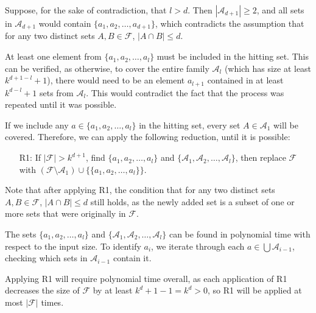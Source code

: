\documentclass[12pt]{article}
\begin{document}
	Suppose, for the sake of contradiction, that \(l > d\). Then
	\(|\mathcal{A}_{d + 1}| \geqslant 2\), and all sets in
	\(\mathcal{A}_{d + 1}\) would contain \(\{a_{1}, a_{2}, \ldots,
	a_{d + 1}\}\), which contradicts the assumption that for any two distinct
	sets \(A, B \in \mathcal{F}\), \(|A \cap B| \leqslant d\).
	
	\medskip
	
	At least one element from \(\{a_{1}, a_{2}, \ldots, a_{l}\}\) must be
	included in the hitting set. This can be verified, as otherwise, to cover
	the entire family \(\mathcal{A}_{l}\) (which has size at least
	\(k^{d + 1 - l} + 1\)), there would need to be an element \(a_{l + 1}\)
	contained in at least \(k^{d - l} + 1\) sets from \(\mathcal{A}_{l}\). This
	would contradict the fact that the process was repeated until it was
	possible.
	
	\medskip
	
	If we include any \(a \in \{a_{1}, a_{2}, \ldots, a_{l}\}\) in the hitting
	set, every set \(A \in \mathcal{A}_{1}\) will be covered. Therefore, we can
	apply the following reduction, until it is possible:
	\begin{itemize}
		\item[R1:] If \(|\mathcal{F}| > k^{d + 1}\), find \(\{a_{1}, a_{2},
		           \ldots, a_{l}\}\) and \(\{\mathcal{A}_{1}, \mathcal{A}_{2},
		           \ldots, \mathcal{A}_{l}\}\), then replace \(\mathcal{F}\)
		           with \((\mathcal{F} \setminus \mathcal{A}_{1}) \cup
		           \{\{a_{1}, a_{2}, \ldots, a_{l}\}\}\).
	\end{itemize}
	Note that after applying R1, the condition that for any two distinct sets
	\(A, B \in \mathcal{F}\), \(|A \cap B| \leqslant d\) still holds, as the
	newly added set is a subset of one or more sets that were originally in
	\(\mathcal{F}\).
	
	\medskip
	
	The sets \(\{a_{1}, a_{2}, \ldots, a_{l}\}\) and \(\{\mathcal{A}_{1},
	\mathcal{A}_{2}, \ldots, \mathcal{A}_{l}\}\) can be found in polynomial time
	with respect to the input size. To identify \(a_{i}\), we iterate through
	each \(a \in \bigcup \mathcal{A}_{i - 1}\), checking which sets in
	\(\mathcal{A}_{i - 1}\) contain it.
	
	\medskip
	
	Applying R1 will require polynomial time overall, as each application of R1
	decreases the size of \(\mathcal{F}\) by at least \(k^{d} + 1 - 1 = k^{d} >
	0\), so R1 will be applied at most \(|\mathcal{F}|\) times.
	
\end{document}

